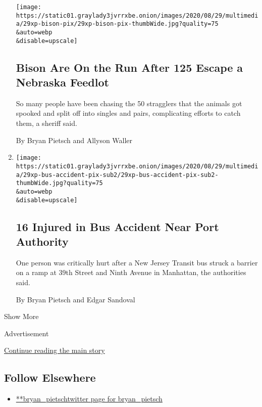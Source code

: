 \begin{enumerate}
  \texttt{[image: https://static01.graylady3jvrrxbe.onion/images/2020/08/29/multimedia/29xp-bison-pix/29xp-bison-pix-thumbWide.jpg?quality=75\\\&auto=webp\\\&disable=upscale]}

  \hypertarget{bison-are-on-the-run-after-125-escape-a-nebraska-feedlot}{%
  \subsection{Bison Are On the Run After 125 Escape a Nebraska
  Feedlot}\label{bison-are-on-the-run-after-125-escape-a-nebraska-feedlot}}

  So many people have been chasing the 50 stragglers that the animals
  got spooked and split off into singles and pairs, complicating efforts
  to catch them, a sheriff said.

  By Bryan Pietsch and Allyson Waller
\item
  \href{/2020/08/29/nyregion/bus-accident-nyc-port-authority.html}{}

  \texttt{[image: https://static01.graylady3jvrrxbe.onion/images/2020/08/29/multimedia/29xp-bus-accident-pix-sub2/29xp-bus-accident-pix-sub2-thumbWide.jpg?quality=75\\\&auto=webp\\\&disable=upscale]}

  \hypertarget{16-injured-in-bus-accident-near-port-authority}{%
  \subsection{16 Injured in Bus Accident Near Port
  Authority}\label{16-injured-in-bus-accident-near-port-authority}}

  One person was critically hurt after a New Jersey Transit bus struck a
  barrier on a ramp at 39th Street and Ninth Avenue in Manhattan, the
  authorities said.

  By Bryan Pietsch and Edgar Sandoval
\end{enumerate}

Show More

Advertisement

\protect\hyperlink{after-mid2}{Continue reading the main story}

\hypertarget{follow-elsewhere}{%
\subsection{Follow Elsewhere}\label{follow-elsewhere}}

\begin{itemize}
\tightlist
\item
  \href{https://twitter.com/bryan_pietsch}{**bryan\_pietschtwitter page
  for bryan\_pietsch}
\end{itemize}

